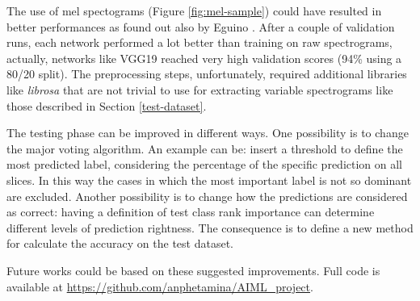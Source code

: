 \documentclass[10pt,twocolumn,letterpaper]{article}
\begin{document}
The use of mel spectograms (Figure \ref{fig:mel-sample}) could have resulted in better performances as found out also by Eguino \cite{Eguino}. After a couple of validation runs, each network performed a lot better than training on raw spectrograms, actually, networks like VGG19 reached very high validation scores (94\% using a 80/20 split). The preprocessing steps, unfortunately, required additional libraries like \textit{librosa} that are not trivial to use for extracting variable spectrograms like those described in Section \ref{test-dataset}.

The testing phase can be improved in different ways. One possibility is to change the major voting algorithm. An example can be: insert a threshold to define the most predicted label, considering the percentage of the specific prediction on all slices. In this way the cases in which the most important label is not so dominant are excluded. Another possibility is to change how the predictions are considered as correct: having a definition of test class rank importance can determine different levels of prediction rightness. The consequence is to define a new method for calculate the accuracy on the test dataset.

Future works could be based on these suggested improvements. Full code is available at \url{https://github.com/anphetamina/AIML_project}.

{\small


}
\end{document}
